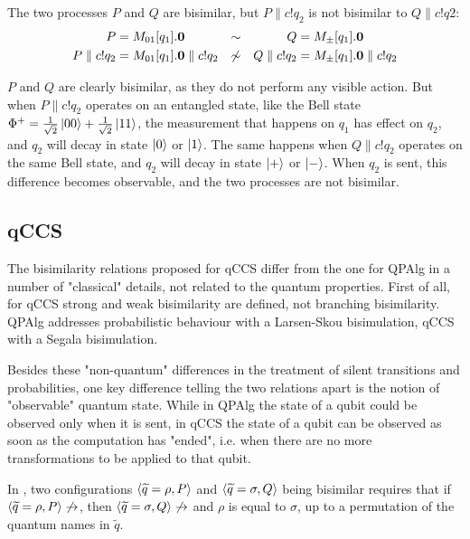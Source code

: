 \begin{example}
The two processes $P$ and $Q$ are bisimilar, but $P\parallel c!q_2$ is not bisimilar to $Q \parallel c!q2$:
\begin{align*}
 P &= M_{01}[q_1].\mathbf{0} &\sim & & Q &= M_\pm[q_1].\mathbf{0} \\ 
 P \parallel c!q_2 &=  M_{01}[q_1].\mathbf{0} \parallel c!q_2 &\not\sim & & Q \parallel c!q_2 &=  M_\pm[q_1].\mathbf{0} \parallel c!q_2 
\end{align*} 

$P$ and $Q$ are clearly bisimilar, as they do not perform any visible action. But when $P\parallel c!q_2$ operates on an entangled state, like the Bell state $\Phi^+ = \frac{1}{\sqrt{2}}\ket{00} + \frac{1}{\sqrt{2}}\ket{11}$, the measurement that happens on $q_1$ has effect on $q_2$, and $q_2$ will decay in state $\ket{0}$ or $\ket{1}$. The same happens when $Q\parallel c!q_2$ operates on the same Bell state, and $q_2$ will decay in state $\ket{+}$ or $\ket{-}$. When $q_2$ is sent, this difference becomes observable, and the two processes are not bisimilar.
\end{example}
\subsection{qCCS}

The bisimilarity relations proposed for qCCS differ from the one for QPAlg in a number of "classical" details, not related to the quantum properties. First of all, for qCCS strong and weak bisimilarity are defined, not branching bisimilarity. QPAlg addresses probabilistic behaviour with a Larsen-Skou bisimulation, qCCS with a Segala bisimulation.

Besides these "non-quantum" differences in the treatment of silent transitions and probabilities, one key difference telling the two relations apart is the notion of "observable" quantum state. While in QPAlg the state of a qubit could be observed only when it is sent, in qCCS the state of a qubit can be observed as soon as the computation has "ended", i.e. when there are no more transformations to be applied to that qubit.

In  \cite{fengProbabilisticBisimulationsQuantum2007}, two configurations $\langle\widetilde{q} = \rho, P\rangle$ and $\langle\widetilde{q} = \sigma, Q\rangle$ being bisimilar requires that if $\langle\widetilde{q} = \rho, P\rangle \not\rightarrow$, then $\langle\widetilde{q} = \sigma, Q\rangle \not\rightarrow$ and $\rho$ is equal to $\sigma$, up to a permutation of the quantum names in $\widetilde{q}$. 

